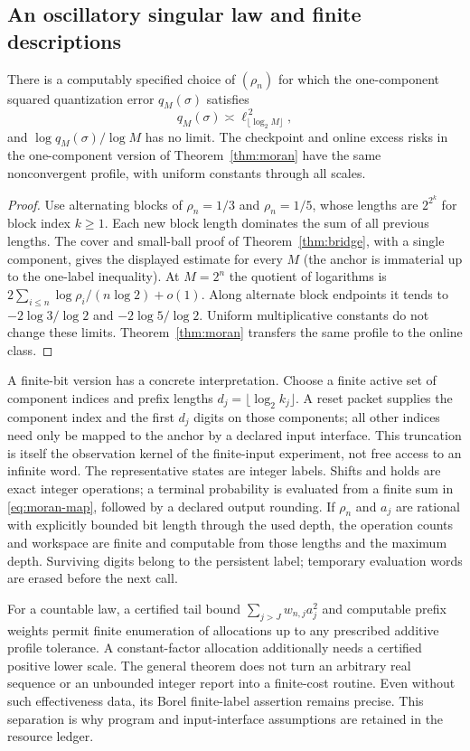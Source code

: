 \subsection{An oscillatory singular law and finite descriptions}
\begin{corollary}\label{cor:no-dimension}
There is a computably specified choice of $(\rho_n)$ for which the one-component squared quantization error $q_M(\sigma)$ satisfies
\[
 q_M(\sigma)\asymp\ell_{\lfloor\log_2M\rfloor}^{\,2},
\]
and $\log q_M(\sigma)/\log M$ has no limit. The checkpoint and online excess risks in the one-component version of Theorem~\ref{thm:moran} have the same nonconvergent profile, with uniform constants through all scales.
\end{corollary}
\begin{proof}
Use alternating blocks of $\rho_n=1/3$ and $\rho_n=1/5$, whose lengths are $2^{2^k}$ for block index $k\ge1$. Each new block length dominates the sum of all previous lengths. The cover and small-ball proof of Theorem~\ref{thm:bridge}, with a single component, gives the displayed estimate for every $M$ (the anchor is immaterial up to the one-label inequality). At $M=2^n$ the quotient of logarithms is
$2\sum_{i\le n}\log\rho_i/(n\log2)+o(1)$.
Along alternate block endpoints it tends to $-2\log3/\log2$ and $-2\log5/\log2$. Uniform multiplicative constants do not change these limits. Theorem~\ref{thm:moran} transfers the same profile to the online class.
\end{proof}

A finite-bit version has a concrete interpretation. Choose a finite active set of component indices and prefix lengths $d_j=\lfloor\log_2k_j\rfloor$. A reset packet supplies the component index and the first $d_j$ digits on those components; all other indices need only be mapped to the anchor by a declared input interface. This truncation is itself the observation kernel of the finite-input experiment, not free access to an infinite word. The representative states are integer labels. Shifts and holds are exact integer operations; a terminal probability is evaluated from a finite sum in \eqref{eq:moran-map}, followed by a declared output rounding. If $\rho_n$ and $a_j$ are rational with explicitly bounded bit length through the used depth, the operation counts and workspace are finite and computable from those lengths and the maximum depth. Surviving digits belong to the persistent label; temporary evaluation words are erased before the next call.

For a countable law, a certified tail bound $\sum_{j>J}w_{n,j}a_j^2$ and computable prefix weights permit finite enumeration of allocations up to any prescribed additive profile tolerance. A constant-factor allocation additionally needs a certified positive lower scale. The general theorem does not turn an arbitrary real sequence or an unbounded integer report into a finite-cost routine. Even without such effectiveness data, its Borel finite-label assertion remains precise. This separation is why program and input-interface assumptions are retained in the resource ledger.
